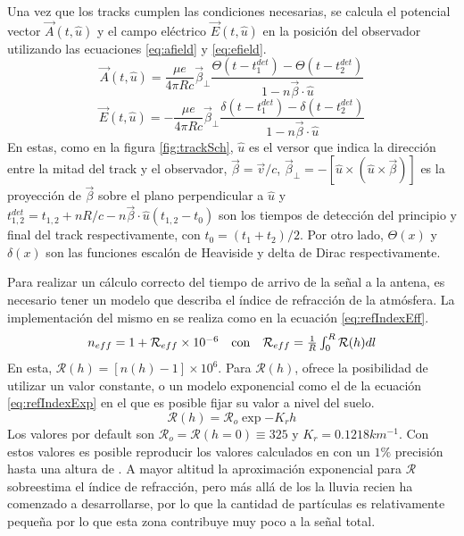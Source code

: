 		Una vez que los tracks cumplen las condiciones necesarias, se calcula el potencial vector $\vec{A}(t,\hat{u})$ y el campo el\'ectrico $\vec{E}(t,\hat{u})$ en la posici\'on del observador utilizando las ecuaciones \ref{eq:afield} y \ref{eq:efield}.
		\begin{equation}
		\vec{A}(t,\hat{u})
		=
		\frac{\mu e}{4\pi Rc}
		\vec\beta_{\bot}
		\frac{\Theta(t-t^{det}_1)-\Theta(t-t^{det}_2)}{1-n\vec\beta\cdot\hat u}
		\label{eq:afield}
		\end{equation}
		\begin{equation}
		\vec{E}(t,\hat{u})
		=
		-\frac{\mu e}{4\pi Rc}
		\vec\beta_{\bot}
		\frac{\delta(t-t^{det}_1)-\delta(t-t^{det}_2)}{1-n\vec\beta\cdot\hat u}
		\label{eq:efield}
		\end{equation}
		En estas, como en la figura \ref{fig:trackSch}, $\hat{u}$ es el versor que indica la direcci\'on entre la mitad del track y el observador, $\vec\beta=\vec v/c$, $\vec\beta_{\bot}=-[\hat{u}\times(\hat{u}\times\vec\beta)]$ es la proyecci\'on de $\vec\beta$ sobre el plano perpendicular a $\hat u$ y $t_{1,2}^{det}=t_{1,2}+nR/c-n\vec\beta \cdot \hat u (t_{1,2}-t_0)$ son los tiempos de detecci\'on del principio y final del track respectivamente, con $t_0=(t_1+t_2)/2$. Por otro lado, $\Theta(x)$ y $\delta(x)$ son las funciones escalón de Heaviside y delta de Dirac respectivamente.
		
		Para realizar un c\'alculo correcto del tiempo de arrivo de la se\~nal a la antena, es necesario tener un modelo que describa el \'indice de refracci\'on de la atm\'osfera.
		La implementación del mismo en \zhs{} se realiza como en la ecuaci\'on \ref{eq:refIndexEff}.
		\begin{equation}
			\begin{matrix}
			n_{eff}
			=
			1+{\mathcal R}_{eff}\times10^{-6}
			&
			{\rm con}
			&
			{\mathcal R}_{eff}
			=
			\frac{1}{R}\int_0^R{\mathcal R}(h)dl
			\end{matrix}
		\label{eq:refIndexEff}
		\end{equation}
		En esta, ${\mathcal R}(h) = \left[ n(h)-1 \right] \times 10^6$.
		Para ${\mathcal R}(h)$, \zhs{} ofrece la posibilidad de utilizar un valor constante, o un modelo exponencial como el de la ecuaci\'on \ref{eq:refIndexExp} en el que es posible fijar su valor a nivel del suelo.
		\begin{equation}
		{\mathcal R}(h)
		=
		{\mathcal R}_o
		\exp{-K_rh}
		\label{eq:refIndexExp}
		\end{equation}
		Los valores por default son ${\mathcal R}_o={\mathcal R}(h=0)\equiv 325$ y $K_r=0.1218km^{-1}$.
		Con estos valores es posible reproducir los valores calculados en \cite{gerson1948polar} con un $1\%$ precisi\'on hasta una altura de .
		A mayor altitud la aproximaci\'on exponencial para ${\mathcal R}$ sobreestima el \'indice de refracci\'on, pero m\'as all\'a de los  la lluvia recien ha comenzado a desarrollarse, por lo que la cantidad de part\'iculas es relativamente peque\~na por lo que esta zona contribuye muy poco a la se\~nal total.
		
